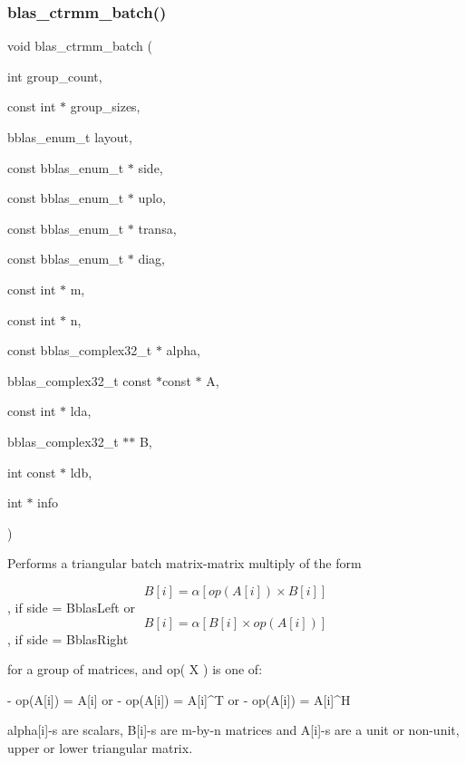 \subsubsection{\texorpdfstring{blas\+\_\+ctrmm\+\_\+batch()}{blas\_ctrmm\_batch()}}
{\footnotesize\ttfamily void blas\+\_\+ctrmm\+\_\+batch (\begin{DoxyParamCaption}\item[{int}]{group\+\_\+count,  }\item[{const int $\ast$}]{group\+\_\+sizes,  }\item[{bblas\+\_\+enum\+\_\+t}]{layout,  }\item[{const bblas\+\_\+enum\+\_\+t $\ast$}]{side,  }\item[{const bblas\+\_\+enum\+\_\+t $\ast$}]{uplo,  }\item[{const bblas\+\_\+enum\+\_\+t $\ast$}]{transa,  }\item[{const bblas\+\_\+enum\+\_\+t $\ast$}]{diag,  }\item[{const int $\ast$}]{m,  }\item[{const int $\ast$}]{n,  }\item[{const bblas\+\_\+complex32\+\_\+t $\ast$}]{alpha,  }\item[{bblas\+\_\+complex32\+\_\+t const $\ast$const $\ast$}]{A,  }\item[{const int $\ast$}]{lda,  }\item[{bblas\+\_\+complex32\+\_\+t $\ast$$\ast$}]{B,  }\item[{int const $\ast$}]{ldb,  }\item[{int $\ast$}]{info }\end{DoxyParamCaption})}

Performs a triangular batch matrix-\/matrix multiply of the form

\[B[i] = \alpha [op( A[i] ) \times B[i]] \], if side = Bblas\+Left or \[B[i] = \alpha [B[i] \times op( A[i]) ] \], if side = Bblas\+Right

for a group of matrices, and op( X ) is one of\+: \begin{DoxyVerb}    - op(A[i]) = A[i]   or
    - op(A[i]) = A[i]^T or
    - op(A[i]) = A[i]^H
\end{DoxyVerb}


alpha\mbox{[}i\mbox{]}-\/s are scalars, B\mbox{[}i\mbox{]}-\/s are m-\/by-\/n matrices and A\mbox{[}i\mbox{]}-\/s are a unit or non-\/unit, upper or lower triangular matrix.



